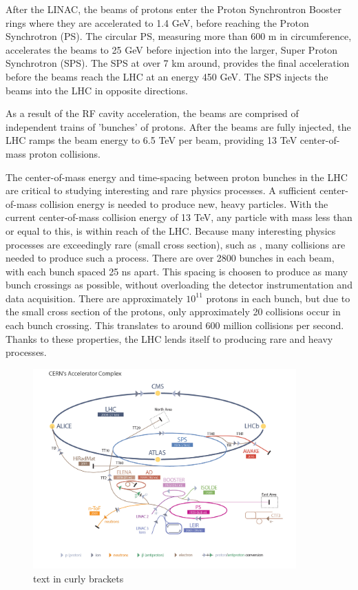 After the LINAC, the beams of protons enter the Proton Synchrontron Booster rings where
they are accelerated to 1.4 GeV, before reaching the Proton
Synchrotron (PS). The circular PS, measuring more than 600 m
in circumference, accelerates the beams to 25 GeV before injection into the
larger, Super Proton Synchrotron (SPS). The SPS at over 7 km around, provides the final
acceleration before the beams reach the LHC at an energy 450 GeV. The SPS injects the beams into
the LHC in opposite directions.

As a result of the RF cavity acceleration, the beams are comprised of independent
trains of 'bunches' of protons. After the beams are fully injected, the LHC ramps the beam energy to 6.5 TeV per beam,
providing 13 TeV center-of-mass proton collisions.

The center-of-mass energy and time-spacing between proton bunches in the LHC are critical to studying interesting
and rare physics processes. A sufficient center-of-mass collision energy is needed to produce new, heavy particles.
With the current center-of-mass collision energy of 13 TeV, any particle with mass less than or equal to this, is 
within reach of the LHC. Because many interesting physics processes are exceedingly rare (small cross section), such as \tth, many collisions
are needed to produce such a process. There are over 2800 bunches in each beam, with each bunch spaced 25 ns apart. This spacing is choosen to
produce as many bunch crossings as possible, without overloading
the detector instrumentation and data acquisition. There are approximately $10^{11}$ protons in each bunch, but due to the small cross section of the protons,
only approximately 20 collisions occur in each bunch crossing. This translates to around 600 million collisions per second. Thanks to these properties, the LHC
lends itself to producing rare and heavy processes. 

\begin{figure}[hbtp]
 \begin{center}
   \includegraphics[width=0.9\textwidth]{lhc_complex.pdf}
   \caption[text in square brackets]{text in curly brackets}
   \label{fig:lhc_complex}
 \end{center}
\end{figure}

